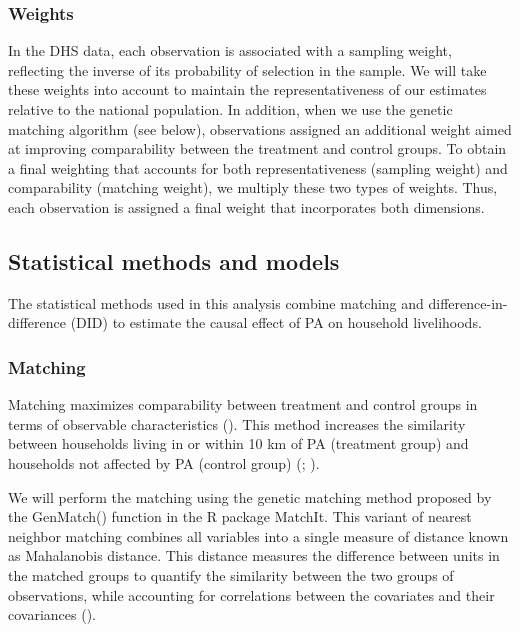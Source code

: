 \documentclass[
]{article}
\begin{document}
\subsubsection{Weights}\label{weights}

In the DHS data, each observation is associated with a sampling weight,
reflecting the inverse of its probability of selection in the sample. We
will take these weights into account to maintain the representativeness
of our estimates relative to the national population. In addition, when
we use the genetic matching algorithm (see below), observations assigned
an additional weight aimed at improving comparability between the
treatment and control groups. To obtain a final weighting that accounts
for both representativeness (sampling weight) and comparability
(matching weight), we multiply these two types of weights. Thus, each
observation is assigned a final weight that incorporates both
dimensions.

\subsection{Statistical methods and
models}\label{statistical-methods-and-models}

The statistical methods used in this analysis combine matching and
difference-in-difference (DID) to estimate the causal effect of PA on
household livelihoods.

\subsubsection{Matching}\label{matching}

Matching maximizes comparability between treatment and control groups in
terms of observable characteristics (). This method increases the similarity between households living
in or within 10 km of PA (treatment group) and households not affected
by PA (control group) (;
).

We will perform the matching using the genetic matching method proposed
by the GenMatch() function in the R package MatchIt. This variant of
nearest neighbor matching combines all variables into a single measure
of distance known as Mahalanobis distance. This distance measures the
difference between units in the matched groups to quantify the
similarity between the two groups of observations, while accounting for
correlations between the covariates and their covariances
().
\end{document}
